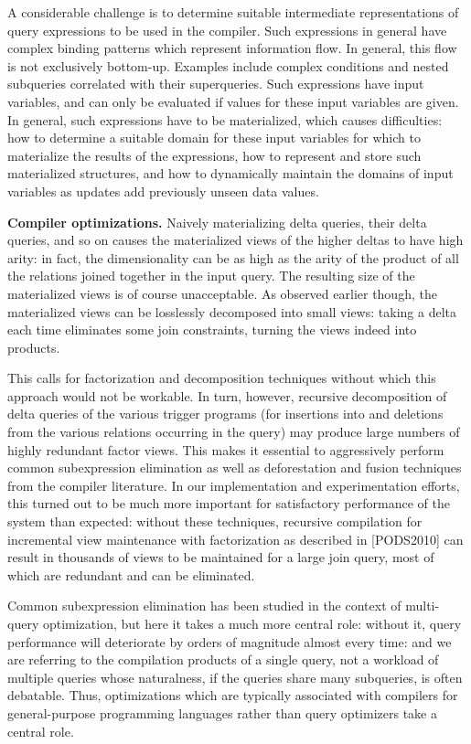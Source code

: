 A considerable challenge is to determine suitable intermediate representations of query expressions to be used in the compiler. Such expressions in general have complex binding patterns which represent information flow. In general, this flow is not exclusively bottom-up.
Examples include complex conditions and nested subqueries correlated with their superqueries. Such expressions have input variables, and can only be evaluated if values for these input variables are given. In general, such expressions have to be materialized, which causes difficulties: how to determine a suitable domain for these input variables for which to materialize the results of the expressions, how to represent and store such materialized structures, and how to dynamically maintain the domains of input variables as updates add previously unseen data values.


{\bf Compiler optimizations.}
%
Naively materializing delta queries, their delta queries, and so on causes the materialized views of the higher deltas to have high arity: in fact, the dimensionality can be as high as the arity of the product of all the relations joined together in the input query. The resulting size of the materialized views is of course unacceptable. As observed earlier \cite{ahmad-vldb:09, koch-pods:10} though, the materialized views can be losslessly decomposed into small views: taking a delta each time eliminates some join constraints, turning the views indeed into products.

This calls for factorization and decomposition techniques without which this approach would not be workable. In turn, however, recursive decomposition of delta queries of the various trigger programs (for insertions into and deletions from the various relations occurring in the query) may produce large numbers of highly redundant factor views. This makes it essential to aggressively perform common subexpression elimination as well as deforestation and fusion techniques from the compiler literature. In our implementation and experimentation efforts, this turned out to be much more important for satisfactory performance of the system than expected: without these techniques, recursive compilation for incremental view maintenance with factorization as described in [PODS2010] can result in thousands of views to be maintained for a large join query, most of which are redundant and can be eliminated.

Common subexpression elimination has been studied in the context of multi-query optimization, but here it takes a much more central role: without it, query performance will deteriorate by orders of magnitude almost every time: and we are referring to the compilation products of a single query, not a workload of multiple queries whose naturalness, if the queries share many subqueries, is often debatable. Thus, optimizations which are typically associated with compilers for general-purpose programming languages rather than query optimizers take a central role.

